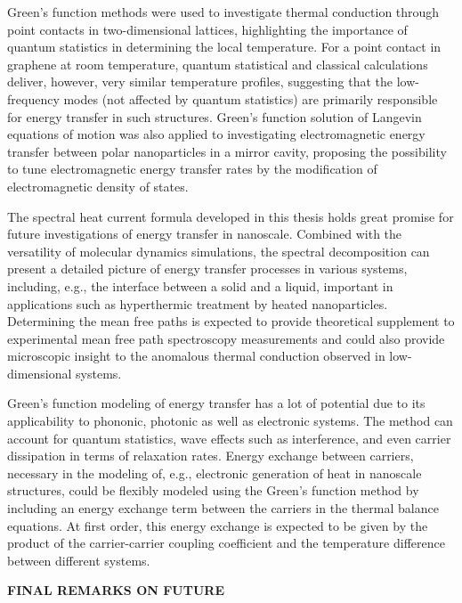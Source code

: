Green's function methods were used to investigate thermal conduction through point contacts in two-dimensional lattices, highlighting the importance of quantum statistics in determining the local temperature. For a point contact in graphene at room temperature, quantum statistical and classical calculations deliver, however, very similar temperature profiles, suggesting that the low-frequency modes (not affected by quantum statistics) are primarily responsible for energy transfer in such structures. Green's function solution of Langevin equations of motion was also applied to investigating electromagnetic energy transfer between polar nanoparticles in a mirror cavity, proposing the possibility to tune electromagnetic energy transfer rates by the modification of electromagnetic density of states. 

The spectral heat current formula developed in this thesis holds great promise for future investigations of energy transfer in nanoscale. Combined with the versatility of molecular dynamics simulations, the spectral decomposition can present a detailed picture of energy transfer processes in various systems, including, e.g., the interface between a solid and a liquid, important in applications such as hyperthermic treatment by heated nanoparticles. Determining the mean free paths is expected to provide theoretical supplement to experimental mean free path spectroscopy measurements and could also provide microscopic insight to the anomalous thermal conduction observed in low-dimensional systems.

Green's function modeling of energy transfer has a lot of potential due to its applicability to phononic, photonic as well as electronic systems. The method can account for quantum statistics, wave effects such as interference, and even carrier dissipation in terms of relaxation rates. Energy exchange between carriers, necessary in the modeling of, e.g., electronic generation of heat in nanoscale structures, could be flexibly modeled using the Green's function method by including an energy exchange term between the carriers in the thermal balance equations. At first order, this energy exchange is expected to be given by the product of the carrier-carrier coupling coefficient and the temperature difference between different systems.

\textbf{FINAL REMARKS ON FUTURE}




